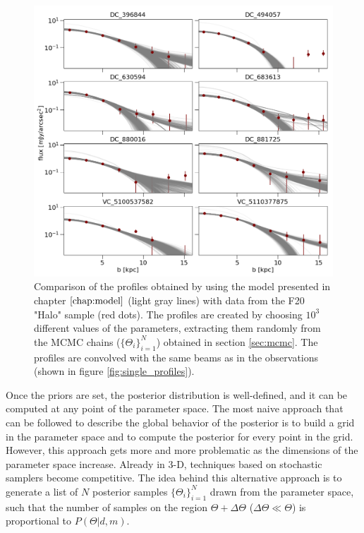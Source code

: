 \begin{figure}[t]
    \centering
    \includegraphics[width=1.0\textwidth]{plots/mcmc_emission.png}
    \caption{Comparison of the \CII profiles obtained by using the model presented in chapter $\ref{chap:model}$ (light gray lines) with data from the F20 "\CII Halo" sample (red dots). The profiles are created by choosing $10^3$ different values of the parameters, extracting them randomly from the MCMC chains ($\{\Theta_i\}_{i=1}^N$) obtained in section \ref{sec:mcmc}. The profiles are convolved with the same beams as in the observations (shown in figure \ref{fig:single_profiles}).
    \label{fig:mcmc_emission}
    }
\end{figure}

Once the priors are set, the posterior distribution is well-defined, and it can be computed at any point of the parameter space. The most naive approach that can be followed to describe the global behavior of the posterior is to build a grid in the parameter space and to compute the posterior for every point in the grid. However, this approach gets more and more problematic as the dimensions of the parameter space increase. Already in 3-D, techniques based on stochastic samplers become competitive. The idea behind this alternative approach is to generate a list of $N$ posterior samples $\{\Theta_i\}_{i=1}^N$ drawn from the parameter space, such that the number of samples on the region $\Theta + \Delta \Theta$ ($\Delta \Theta \ll \Theta$) is proportional to $P(\Theta|d,m)$. 

